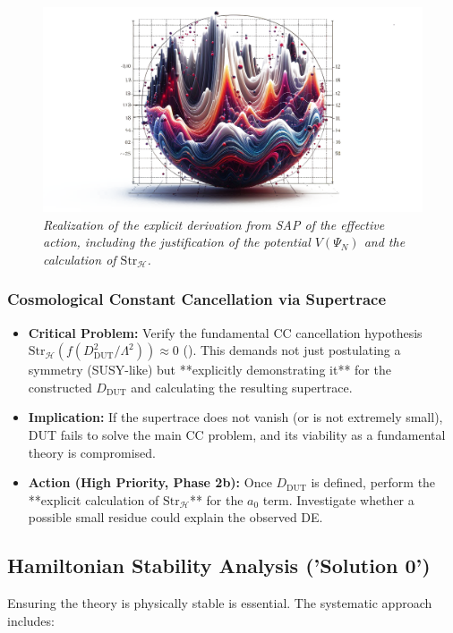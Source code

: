 \documentclass[11pt, a4paper]{article}
\theoremstyle{remark}
\newcommand{\Str}{\mathrm{Str}}
\begin{document}
\begin{figure}[htbp]
    \centering
    \includegraphics[width=0.6\linewidth]{OIG38.ZNLJ.PNG}
    \caption{%
     \footnotesize\textit{Realization of the explicit derivation from SAP of the effective action, including the justification of the potential \(V(\Psi_N)\) and the calculation of \(\Str_{\mathcal{H}}\).}
    }
    \label{fig:Figura19}
\end{figure}

\subsubsection{Cosmological Constant Cancellation via Supertrace}
\label{ssubsec:cc_cancel_challenge_detailed}
\begin{itemize}
    \item \textbf{Critical Problem:} Verify the fundamental CC cancellation hypothesis \( \Str_{\mathcal{H}}(f(D_{\text{DUT}}^2/\Lambda^2)) \approx 0 \) (). This demands not just postulating a symmetry (SUSY-like) but **explicitly demonstrating it** for the constructed \( D_{\text{DUT}} \) and calculating the resulting supertrace.
    \item \textbf{Implication:} If the supertrace does not vanish (or is not extremely small), DUT fails to solve the main CC problem, and its viability as a fundamental theory is compromised.
    \item \textbf{Action (High Priority, Phase 2b):} Once \( D_{\text{DUT}} \) is defined, perform the **explicit calculation of \( \Str_{\mathcal{H}} \)** for the \( a_0 \) term. Investigate whether a possible small residue could explain the observed DE.
\end{itemize}

\subsection{Hamiltonian Stability Analysis ('Solution 0')}
\label{subsec:hamiltonian_stability_analysis_detailed}

Ensuring the theory is physically stable is essential. The systematic approach includes:
\end{document}
